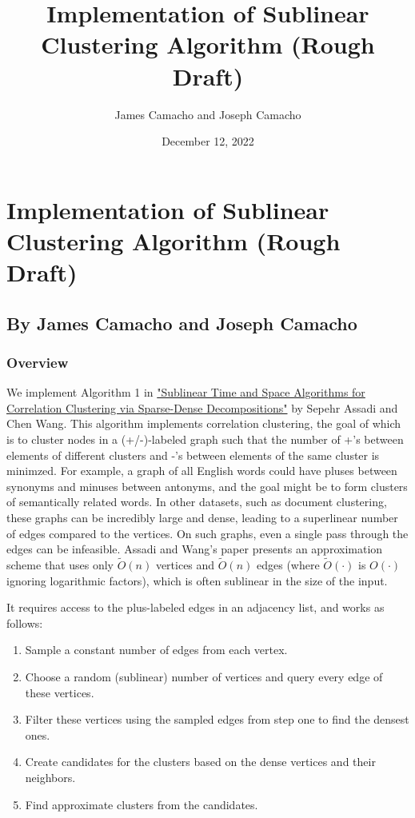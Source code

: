 \documentclass[
]{article}
\title{Implementation of Sublinear Clustering Algorithm (Rough Draft)}
\author{James Camacho and Joseph Camacho}
\date{December 12, 2022}
\providecommand{\tightlist}{%
  \setlength{\itemsep}{0pt}\setlength{\parskip}{0pt}}
\begin{document}
\maketitle

\hypertarget{implementation-of-sublinear-clustering-algorithm-rough-draft}{%
  \section{Implementation of Sublinear Clustering Algorithm (Rough
    Draft)}\label{implementation-of-sublinear-clustering-algorithm-rough-draft}}

\hypertarget{by-james-camacho-and-joseph-camacho}{%
  \subsection{By James Camacho and Joseph
    Camacho}\label{by-james-camacho-and-joseph-camacho}}

\hypertarget{overview}{%
  \subsubsection{Overview}\label{overview}}

We implement Algorithm 1 in
\href{https://doi.org/10.48550/arxiv.2109.14528}{"Sublinear Time and
  Space Algorithms for Correlation Clustering via Sparse-Dense
  Decompositions"} by Sepehr Assadi and Chen Wang. This algorithm implements
correlation clustering, the goal of which is to cluster nodes in a (+/-)-labeled
graph such that the number of +'s between elements of different clusters and
-'s between elements of the same cluster is minimzed. For example, a graph of
all English words could have pluses between synonyms and minuses between
antonyms, and the goal might be to form clusters of semantically related words.
In other datasets, such as document clustering, these graphs can be
incredibly large and dense, leading to a superlinear number of edges
compared to the vertices. On such graphs, even a single pass through the edges can be
infeasible. Assadi and Wang's paper presents an approximation scheme
that uses only {\(\tilde{O}(n)\)} vertices and {\(\tilde{O}(n)\)} edges
(where $\tilde{O}(\cdot)$ is $O(\cdot)$ ignoring logarithmic factors),
which is often sublinear in the size of the input.

It requires access to the plus-labeled edges in an adjacency list, and
works as follows:

\begin{enumerate}
  \tightlist
  \item
        Sample a constant number of edges from each vertex.
  \item
        Choose a random (sublinear) number of vertices and query every edge of
        these vertices.
  \item
        Filter these vertices using the sampled edges from step one to find
        the densest ones.
  \item
        Create candidates for the clusters based on the dense vertices and
        their neighbors.
  \item
        Find approximate clusters from the candidates.
\end{enumerate}
\end{document}
